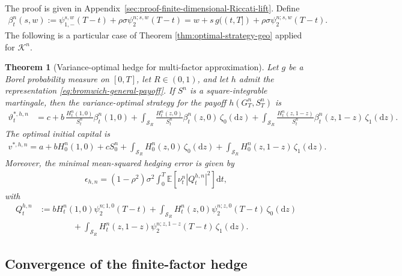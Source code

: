 \documentclass[10pt,a4paper,reqno]{amsart}
\theoremstyle{plain}
\newtheorem{theorem}{Theorem}[section]
\theoremstyle{definition}
\theoremstyle{remark}
\theoremstyle{example}
\begin{document}
The proof is given in Appendix~\ref{sec:proof-finite-dimensional-Riccati-lift}.
Define 
\begin{align}\label{eq:lifted-beta}
    \beta_t^n(s,w) := \psi_{1,-}^{s,w}(T-t) + \rho\sigma \psi_2^{n;s,w}(T-t) 
    = w+s\,g((t,T]) + \rho\sigma \psi_2^{n;s,w}(T-t).
\end{align}
The following is a particular case of Theorem \ref{thm:optimal-strategy-geo} applied for $\mathcal{K}^n$.

\begin{theorem}[Variance-optimal hedge for multi-factor approximation]\label{thm:lifted-general-hedge}
Let $g$ be a Borel probability measure on $[0,T]$, let $R\in(0,1)$, and let $h$ admit the representation \eqref{eq:bromwich-general-payoff}. If $S^n$ is a square-integrable martingale, then the variance-optimal strategy for the payoff $h(G^n_T,S^n_T)$ is
\begin{align}
    \vartheta_t^{*,h,n} &= c + b\, \frac{H^n_t(1,0)}{S^n_t} \beta^n_t(1,0) + \int_{\mathcal S_R} \frac{H^n_t(z,0)}{S^n_t} \beta^n_t(z,0)\, \zeta_0(\mathrm dz) + \int_{\mathcal S_R} \frac{H^n_t(z,1-z)}{S^n_t} \beta^n_t(z,1-z)\, \zeta_1(\mathrm dz). 
\end{align}
The optimal initial capital is
\begin{align*}
    v^{*,h,n} = a + bH^n_0(1,0) + cS^n_0 + \int_{\mathcal S_R} H^n_0(z,0)\, \zeta_0(\mathrm dz) + \int_{\mathcal S_R} H^n_0(z,1-z)\, \zeta_1(\mathrm dz).
\end{align*}
Moreover, the minimal mean-squared hedging error is given by
\begin{align*}
    \epsilon_{h,n} = (1-\rho^2)\sigma^2 \int_0^T \mathbb E\left[ \nu^n_t |Q_t^{h,n}|^2 \right] \mathrm dt,
\end{align*}
with 
\begin{align}\label{eq:Qh-general-g-lifted}
    Q_t^{h,n} &:= bH^n_t(1,0)\psi_2^{n;1,0}(T-t) + \int_{\mathcal S_R} H^n_t(z,0) \psi_2^{n;z,0}(T-t)\, \zeta_0(\mathrm dz) 
    \\ \nonumber &\qquad \qquad + \int_{\mathcal S_R} H^n_t(z,1-z) \psi_2^{n;z,1-z}(T-t)\, \zeta_1(\mathrm dz).
\end{align}
\end{theorem}



\subsection{Convergence of the finite-factor hedge}
\label{subsec:optimality}
\end{document}
